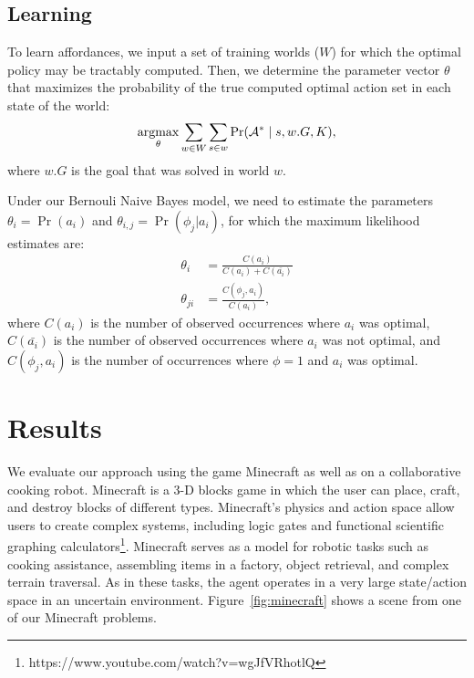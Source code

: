 \documentclass[conference]{IEEEtran}
\newcommand{\argmax}{\operatornamewithlimits{argmax}}
\begin{document}
\subsection{Learning}

To learn affordances, we input a set of training worlds ($W$) for which the optimal policy may be tractably computed. Then, we determine the parameter vector $\theta$ that maximizes the probability of the true computed optimal action set in each state of the world:
\begin{equation}
\argmax_\theta \sum_{w \in W} \sum_{s \in w} \Pr(\mathcal{A}^* \mid s, w.G, K),
\end{equation}
where $w.G$ is the goal that was solved in world $w$.

Under our Bernouli Naive Bayes model, we need to estimate the parameters $\theta_i = \Pr(a_i)$ and $\theta_{i,j} = \Pr(\phi_j | a_i)$, for which the maximum likelihood estimates are:
\begin{align}
\theta_i &= \frac{C(a_i)}{C(a_i) + C(\bar{a_i})} \\
\theta_{ji} &= \frac{C(\phi_j, a_i)}{C(a_i)},
\end{align}
where $C(a_i)$ is the number of observed occurrences where $a_i$ was optimal, $C(\bar{a_i})$ is the number of observed occurrences where $a_i$ was not optimal, and $C(\phi_j, a_i)$ is the number of occurrences where $\phi=1$ and $a_i$ was optimal.

\section{Results}
\label{sec:results}


We evaluate our approach using the game Minecraft as well as on a
collaborative cooking robot.  Minecraft is a 3-D blocks game in which
the user can place, craft, and destroy blocks of different types.
Minecraft's physics and action space allow users to create complex
systems, including logic gates and functional scientific graphing
calculators\footnote{https://www.youtube.com/watch?v=wgJfVRhotlQ}.
Minecraft serves as a model for robotic tasks such as cooking
assistance, assembling items in a factory, object retrieval, and
complex terrain traversal.  As in these tasks, the agent operates in a
very large state/action space in an uncertain environment.
Figure~\ref{fig:minecraft} shows a scene from one of our Minecraft
problems.

\end{document}
